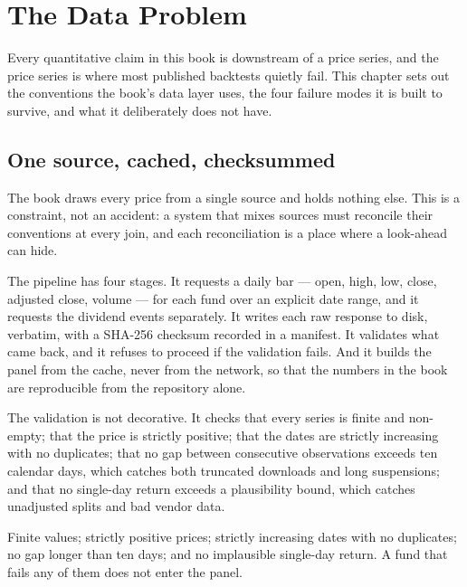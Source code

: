 
\chapter{The Data Problem}
\label{ch:data-problem}

Every quantitative claim in this book is downstream of a price series, and
the price series is where most published backtests quietly fail. This
chapter sets out the conventions the book's data layer uses, the four
failure modes it is built to survive, and what it deliberately does not
have.

\section{One source, cached, checksummed}

The book draws every price from a single source and holds nothing else.
This is a constraint, not an accident: a system that mixes sources must
reconcile their conventions at every join, and each reconciliation is a
place where a look-ahead can hide.

The pipeline has four stages. It requests a daily bar --- open, high, low,
close, adjusted close, volume --- for each fund over an explicit date
range, and it requests the dividend events separately. It writes each raw
response to disk, verbatim, with a SHA-256 checksum recorded in a
manifest. It validates what came back, and it refuses to proceed if the
validation fails. And it builds the panel from the cache, never from the
network, so that the numbers in the book are reproducible from the
repository alone.

The validation is not decorative. It checks that every series is finite
and non-empty; that the price is strictly positive; that the dates are
strictly increasing with no duplicates; that no gap between consecutive
observations exceeds ten calendar days, which catches both truncated
downloads and long suspensions; and that no single-day return exceeds a
plausibility bound, which catches unadjusted splits and bad vendor data.

\begin{takeaway}
Finite values; strictly positive prices; strictly increasing dates with no
duplicates; no gap longer than ten days; and no implausible single-day
return. A fund that fails any of them does not enter the panel.
\end{takeaway}

